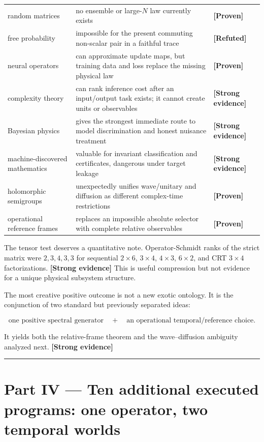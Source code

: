 \documentclass[11pt,a4paper,openany]{report}
\newcommand{\statusProven}{\textcolor{fingreen}{[Proven]}}
\newcommand{\statusStrong}{\textcolor{finblue}{[Strong evidence]}}
\newcommand{\statusRefuted}{\textcolor{finred}{[Refuted]}}
\begin{document}
\begin{center}
\begin{longtable}{@{}p{}p{}p{}@{}}
random matrices & no ensemble or large-\(N\) law currently exists & \textbf{\statusProven{}} \\
free probability & impossible for the present commuting non-scalar pair in a faithful trace & \textbf{\statusRefuted{}} \\
neural operators & can approximate update maps, but training data and loss replace the missing physical law & \textbf{\statusProven{}} \\
complexity theory & can rank inference cost after an input/\allowbreak{}output task exists; it cannot create units or observables & \textbf{\statusStrong{}} \\
Bayesian physics & gives the strongest immediate route to model discrimination and honest nuisance treatment & \textbf{\statusStrong{}} \\
machine-discovered mathematics & valuable for invariant classification and certificates, dangerous under target leakage & \textbf{\statusStrong{}} \\
holomorphic semigroups & unexpectedly unifies wave/\allowbreak{}unitary and diffusion as different complex-time restrictions & \textbf{\statusProven{}} \\
operational reference frames & replaces an impossible absolute selector with complete relative observables & \textbf{\statusProven{}} \\
\bottomrule
\end{longtable}
\endgroup
\end{center}

The tensor test deserves a quantitative note. Operator-Schmidt ranks of the strict matrix were \(2,3,4,3,3\) for sequential \(2\times6\), \(3\times4\), \(4\times3\), \(6\times2\), and CRT \(3\times4\) factorizations. \textbf{\statusStrong{}} This is useful compression but not evidence for a unique physical subsystem structure.

The most creative positive outcome is not a new exotic ontology. It is the conjunction of two standard but previously separated ideas:

\[
\text{one positive spectral generator}
\quad+\quad
\text{an operational temporal/reference choice}.
\]

It yields both the relative-frame theorem and the wave–diffusion ambiguity analyzed next. \textbf{\statusStrong{}}

\par\medskip\hrule\medskip

\chapter{Part IV — Ten additional executed programs: one operator, two temporal worlds}
\end{document}
